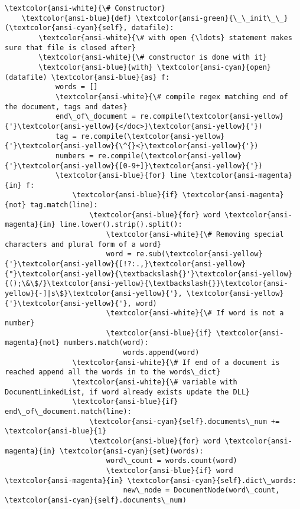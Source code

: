 \documentclass[11pt]{article}
\begin{document}
\begin{Verbatim}[commandchars=\\\{\}]
    \textcolor{ansi-white}{\# Constructor}
    \textcolor{ansi-blue}{def} \textcolor{ansi-green}{\_\_init\_\_}(\textcolor{ansi-cyan}{self}, datafile):
        \textcolor{ansi-white}{\# with open {\ldots} statement makes sure that file is closed after}
        \textcolor{ansi-white}{\# constructor is done with it}
        \textcolor{ansi-blue}{with} \textcolor{ansi-cyan}{open}(datafile) \textcolor{ansi-blue}{as} f:
            words = []
            \textcolor{ansi-white}{\# compile regex matching end of the document, tags and dates}
            end\_of\_document = re.compile(\textcolor{ansi-yellow}{'}\textcolor{ansi-yellow}{</doc>}\textcolor{ansi-yellow}{'})
            tag = re.compile(\textcolor{ansi-yellow}{'}\textcolor{ansi-yellow}{\^{}<}\textcolor{ansi-yellow}{'})
            numbers = re.compile(\textcolor{ansi-yellow}{'}\textcolor{ansi-yellow}{[0-9+]}\textcolor{ansi-yellow}{'})
            \textcolor{ansi-blue}{for} line \textcolor{ansi-magenta}{in} f:
                \textcolor{ansi-blue}{if} \textcolor{ansi-magenta}{not} tag.match(line):
                    \textcolor{ansi-blue}{for} word \textcolor{ansi-magenta}{in} line.lower().strip().split():
                        \textcolor{ansi-white}{\# Removing special characters and plural form of a word}
                        word = re.sub(\textcolor{ansi-yellow}{'}\textcolor{ansi-yellow}{[!?:.,}\textcolor{ansi-yellow}{"}\textcolor{ansi-yellow}{\textbackslash{}'}\textcolor{ansi-yellow}{();\&\$/}\textcolor{ansi-yellow}{\textbackslash{}}\textcolor{ansi-yellow}{-]|s\$}\textcolor{ansi-yellow}{'}, \textcolor{ansi-yellow}{'}\textcolor{ansi-yellow}{'}, word)
                        \textcolor{ansi-white}{\# If word is not a number}
                        \textcolor{ansi-blue}{if} \textcolor{ansi-magenta}{not} numbers.match(word):
                            words.append(word)
                \textcolor{ansi-white}{\# If end of a document is reached append all the words in to the words\_dict}
                \textcolor{ansi-white}{\# variable with DocumentLinkedList, if word already exists update the DLL}
                \textcolor{ansi-blue}{if} end\_of\_document.match(line):
                    \textcolor{ansi-cyan}{self}.documents\_num += \textcolor{ansi-blue}{1}
                    \textcolor{ansi-blue}{for} word \textcolor{ansi-magenta}{in} \textcolor{ansi-cyan}{set}(words):
                        word\_count = words.count(word)
                        \textcolor{ansi-blue}{if} word \textcolor{ansi-magenta}{in} \textcolor{ansi-cyan}{self}.dict\_words:
                            new\_node = DocumentNode(word\_count, \textcolor{ansi-cyan}{self}.documents\_num)

\end{Verbatim}
\end{document}

